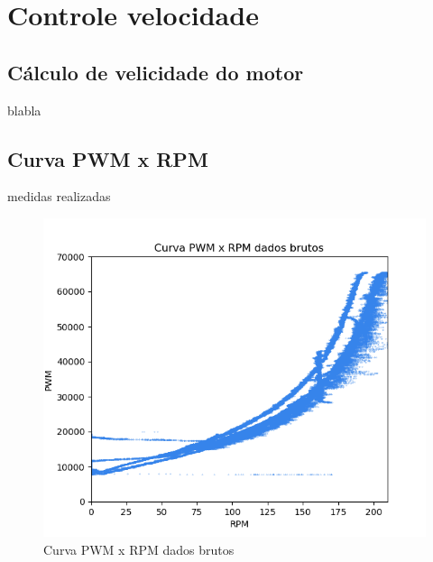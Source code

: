 
\chapter{Controle velocidade}


\section{Cálculo de velicidade do motor}
blabla

\section{Curva PWM x RPM}

medidas realizadas


\begin{figure}[h]
	\centering
	\includegraphics{figures/curva_pwm_x_rpm_dados_brutos}
	\caption{Curva PWM x RPM dados brutos}
	\label{lof}
\end{figure}


